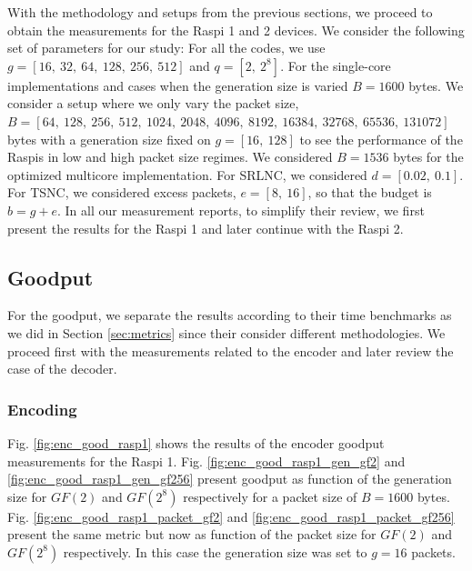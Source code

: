 \label{sec:measurements}

With the methodology and setups from the previous sections, we
proceed to obtain the measurements for the \ac{Raspi} 1 and 2 devices.
We consider the following set of parameters for our study:
For all the codes, we use $g = [16,\ 32,\ 64,\ 128,\ 256,\ 512]$
and $q = [2,\ 2^8]$. For the single-core implementations
and cases when the generation size is varied $B = 1600$ bytes.
We consider a setup where we only vary the packet size,
$B = [64,\ 128,\ 256,\ 512,\ 1024,\ 2048,\ 4096,\ 8192,\ 16384,\ 32768
,\ 65536,\ 131072]$ bytes with a generation size fixed on $g = [16,\ 128]$
to see the performance of the \ac{Raspi}s in low and high
packet size regimes. We considered $B = 1536$ bytes for the optimized
multicore implementation. For \ac{SRLNC}, we considered
$d = [0.02,\ 0.1]$. For \ac{TSNC}, we considered excess packets,
$e = [8,\ 16]$, so that the budget is $b = g + e$. In all our
measurement reports, to simplify their review, we first present the
results for the \ac{Raspi} 1 and later continue with the \ac{Raspi} 2.

\subsection{Goodput}
For the goodput, we separate the results according to their time benchmarks
as we did in Section \ref{sec:metrics} since their consider different
methodologies. We proceed first with the measurements related to the encoder
and later review the case of the decoder.

\subsubsection{Encoding}
Fig. \ref{fig:enc_good_rasp1} shows the results of the encoder goodput
measurements for the \ac{Raspi} 1. Fig. \ref{fig:enc_good_rasp1_gen_gf2}
and \ref{fig:enc_good_rasp1_gen_gf256} present goodput as function of the
generation size for $GF(2)$ and $GF(2^8)$ respectively for a packet size
of $B = 1600$ bytes. Fig. \ref{fig:enc_good_rasp1_packet_gf2} and
\ref{fig:enc_good_rasp1_packet_gf256} present the same metric but now as
function of the packet size for $GF(2)$ and $GF(2^8)$ respectively. In this
case the generation size was set to $g = 16$ packets.

